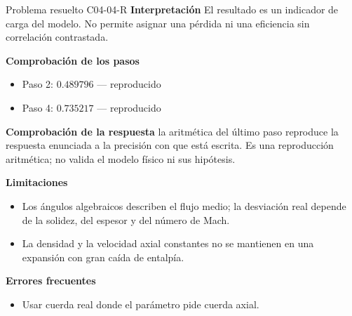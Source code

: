 \documentclass[10pt,openany]{book}
\begin{document}
\begin{studiumworked}{Problema resuelto C04-04-R}
\noindent\textbf{Interpretación}
El resultado es un indicador de carga del modelo. No permite asignar una pérdida ni una eficiencia sin correlación contrastada.

\noindent\textbf{Comprobación de los pasos}
\begin{itemize}
\item Paso 2: $0.489796$ — reproducido
\item Paso 4: $0.735217$ — reproducido
\end{itemize}

\noindent\textbf{Comprobación de la respuesta} la aritmética del último paso reproduce la respuesta enunciada a la precisión con que está escrita. Es una reproducción aritmética; no valida el modelo físico ni sus hipótesis.

\noindent\textbf{Limitaciones}
\begin{itemize}
\item Los ángulos algebraicos describen el flujo medio; la desviación real depende de la solidez, del espesor y del número de Mach.
\item La densidad y la velocidad axial constantes no se mantienen en una expansión con gran caída de entalpía.
\end{itemize}

\noindent\textbf{Errores frecuentes}
\begin{itemize}
\item Usar cuerda real donde el parámetro pide cuerda axial.
\end{itemize}
\end{studiumworked}
\end{document}

